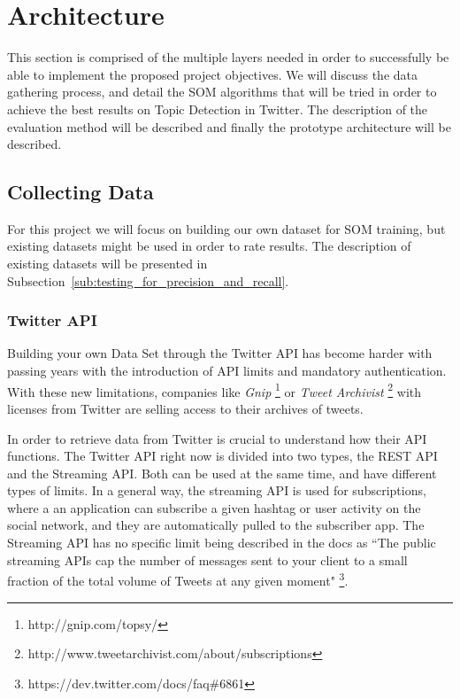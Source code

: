 
\section{Architecture} %
\label{sec:architecture}
This section is comprised of the multiple layers needed in order to successfully be able to implement the proposed project objectives. We will discuss the data gathering process, and detail the SOM algorithms that will be tried in order to achieve the best results on Topic Detection in Twitter. The description of the evaluation method will be described and finally the prototype architecture will be described.

\subsection{Collecting Data} %
\label{sub:data_gathering}
For this project we will focus on building our own  dataset for SOM training, but existing datasets might be used in order to rate results. The description of existing datasets will be presented in Subsection~\ref{sub:testing_for_precision_and_recall}. 

\subsubsection{Twitter API} %
 \label{ssub:building_a_data_set}
 Building your own Data Set through the Twitter API has become harder with passing years with the introduction of API limits and mandatory authentication. With these new limitations, companies like \emph{Gnip} \footnote{http://gnip.com/topsy/} or \emph{Tweet Archivist} \footnote{http://www.tweetarchivist.com/about/subscriptions} with licenses from Twitter are selling access to their archives of tweets.

 In order to retrieve data from Twitter is crucial to understand how their API functions. The Twitter API right now is divided into two types, the REST API and the Streaming API. Both can be used at the same time, and have different types of limits. In a general way, the streaming API is used for subscriptions, where a an application can subscribe a given hashtag or user activity on the social network, and they are automatically pulled to the subscriber app. The Streaming API has no specific limit being described in the docs as ``The public streaming APIs cap the number of messages sent to your client to a small fraction of the total volume of Tweets at any given moment" \footnote{https://dev.twitter.com/docs/faq\#6861}.

